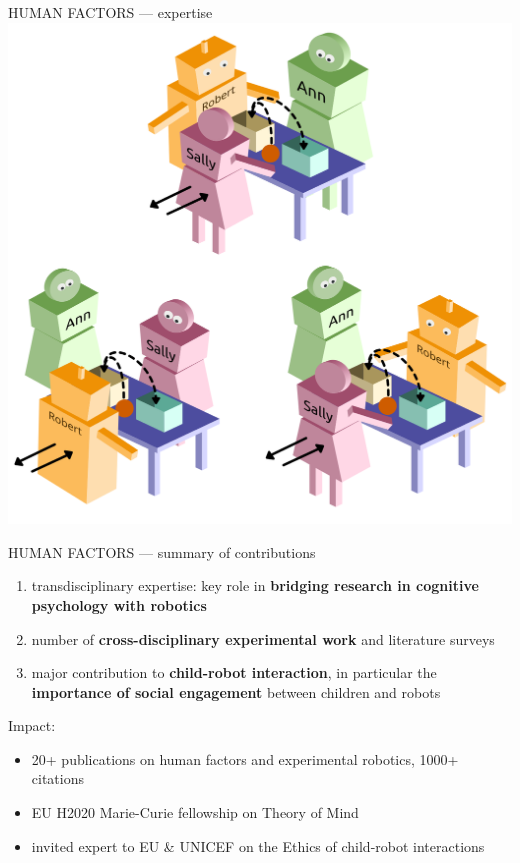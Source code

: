 \documentclass[xcolor=table]{beamer}
\begin{document}
\begin{frame}{HUMAN FACTORS --- expertise}
            \hyperlink{constructs}{\includegraphics[height=0.2\paperheight]{triadic_false_beliefs}}
\end{frame}

\begin{frame}{HUMAN FACTORS --- summary of contributions}

    \begin{enumerate}
        \item transdisciplinary expertise: key role in \textbf{bridging research in cognitive psychology
            with robotics}
        \item number of \textbf{cross-disciplinary experimental work} and literature surveys
        \item major contribution to \textbf{child-robot interaction}, in
            particular the \textbf{importance of social engagement}
            between children and robots
    \end{enumerate}

Impact:
    \begin{itemize}
        \item 20+ publications on human factors and experimental robotics,
              1000+ citations
        \item EU H2020 Marie-Curie fellowship on Theory of Mind
        \item invited expert to EU \& UNICEF on the Ethics of child-robot
            interactions
    \end{itemize}
\end{frame}
\end{document}
